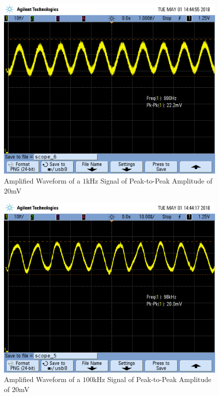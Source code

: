 \begin{figure}[h!]
	\centering
	\includegraphics[scale=0.45]{./images/SCOPE_6.PNG}
	\caption{Amplified Waveform of a $1$\si{\kilo\hertz} Signal of Peak-to-Peak Amplitude of $20$\si{\milli\volt}}
	\label{fig:SCOPE_6}
\end{figure}

\FloatBarrier

\begin{figure}[h!]
	\centering
	\includegraphics[scale=0.45]{./images/SCOPE_5.PNG}
	\caption{Amplified Waveform of a $100$\si{\kilo\hertz} Signal of Peak-to-Peak Amplitude of $20$\si{\milli\volt}}
	\label{fig:SCOPE_5}
\end{figure}

